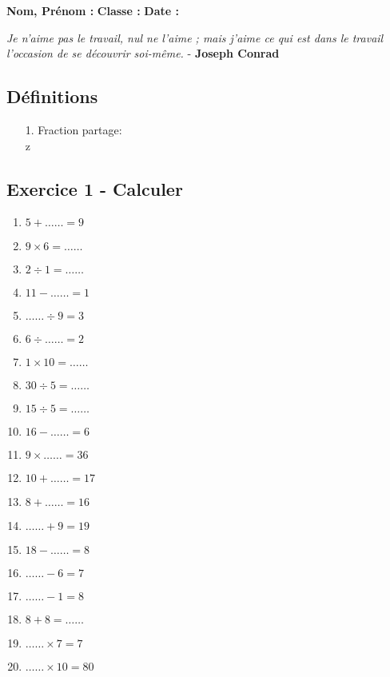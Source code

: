 



\textbf{Nom, Prénom :} \hspace{8cm} \textbf{Classe :} \hspace{3cm} \textbf{Date :}\\
\vspace{-0.8cm}
\begin{center}
  \textit{Je n'aime pas le travail, nul ne l'aime ; mais j'aime ce qui est dans le travail l'occasion de se découvrir soi-même.}  - \textbf{Joseph Conrad}
\end{center}
\vspace{-0.8cm}

\subsection*{Définitions}
  \begin{enumerate}
    \item[1.] Fraction partage: \dotfill \\z
    \Pointilles[2]
  \end{enumerate}

\subsection*{Exercice 1 - Calculer}

\begin{multicols}{3}\noindent
    \begin{enumerate}
      \item $5 + \ldots\ldots = 9$
      \item $9 \times 6 = \ldots\ldots$
      \item $2 \div 1 = \ldots\ldots$
      \item $11 - \ldots\ldots = 1$
      \item $\ldots\ldots \div 9 = 3$
      \item $6 \div \ldots\ldots = 2$
      \item $1 \times 10 = \ldots\ldots$
      \item $30 \div 5 = \ldots\ldots$
      \item $15 \div 5 = \ldots\ldots$
      \item $16 - \ldots\ldots = 6$
      \item $9 \times \ldots\ldots = 36$
      \item $10 + \ldots\ldots = 17$
      \item $8 + \ldots\ldots = 16$
      \item $\ldots\ldots + 9 = 19$
      \item $18 - \ldots\ldots = 8$
      \item $\ldots\ldots - 6 = 7$
      \item $\ldots\ldots - 1 = 8$
      \item $8 + 8 = \ldots\ldots$
      \item $\ldots\ldots \times 7 = 7$
      \item $\ldots\ldots \times 10 = 80$
    \end{enumerate}
  \end{multicols}

